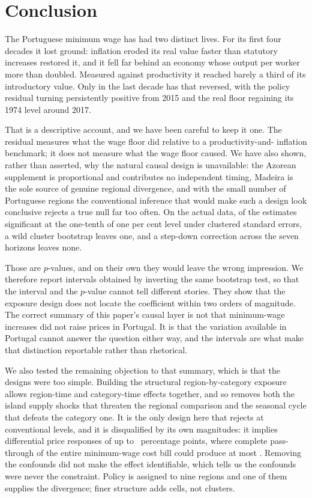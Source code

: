 \section{Conclusion}
\label{sec:conclusion}

The Portuguese minimum wage has had two distinct lives. For its first four
decades it lost ground: inflation eroded its real value faster than statutory
increases restored it, and it fell far behind an economy whose output per worker
more than doubled. Measured against productivity it reached barely a third of
its introductory value. Only in the last decade has that reversed, with the
policy residual turning persistently positive from 2015 and the real floor
regaining its 1974 level around 2017.

That is a descriptive account, and we have been careful to keep it one. The
residual measures what the wage floor did relative to a productivity-and-
inflation benchmark; it does not measure what the wage floor caused. We have
also shown, rather than asserted, why the natural causal design is unavailable:
the Azorean supplement is proportional and contributes no independent timing,
Madeira is the sole source of genuine regional divergence, and with the small
number of Portuguese regions the conventional inference that would make such a
design look conclusive rejects a true null far too often. On the actual data,
of the estimates significant at the one-tenth of one per cent level under
clustered standard errors, a wild cluster bootstrap leaves one, and a step-down
correction across the seven horizons leaves none.

Those are $p$-values, and on their own they would leave the wrong impression.
We therefore report intervals obtained by inverting the same bootstrap test, so
that the interval and the $p$-value cannot tell different stories. They show
that the exposure design does not locate the coefficient within two orders of
magnitude. The correct summary of this paper's causal layer is not that
minimum-wage increases did not raise prices in Portugal. It is that the
variation available in Portugal cannot answer the question either way, and the
intervals are what make that distinction reportable rather than rhetorical.

We also tested the remaining objection to that summary, which is that the
designs were too simple. Building the structural region-by-category exposure
allows region-time and category-time effects together, and so removes both the
island supply shocks that threaten the regional comparison and the seasonal
cycle that defeats the category one. It is the only design here that rejects at
conventional levels, and it is disqualified by its own magnitudes: it implies
differential price responses of up to \StructuralPeakResponsePP{}~percentage
points, where complete pass-through of the entire minimum-wage cost bill could
produce at most \StructuralPassThroughCeilingPP{}. Removing the
confounds did not make the effect identifiable, which tells us the confounds were
never the constraint. Policy is assigned to nine regions and one of them supplies
the divergence; finer structure adds cells, not clusters.

